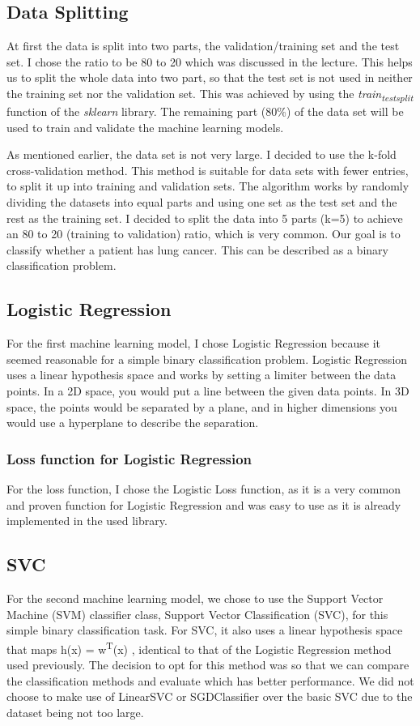 \documentclass[a4paper,12pt]{article}
\begin{document}
\subsection{Data Splitting}
\label{sec:orgf92fcc7}
At first the data is split into two parts, the validation/training set and the test set. I chose the ratio to be 80 to 20 which was discussed in the lecture.
This helps us to split the whole data into two part, so that the test set is not used in neither the training set nor the validation set.
This was achieved by using the \emph{train\textsubscript{test}\textsubscript{split}} function of the \emph{sklearn} library.
The remaining part (80\%) of the data set will be used to train and validate the machine learning models.

As mentioned earlier, the data set is not very large.
I decided to use the k-fold cross-validation method. This method is suitable for data sets with fewer entries, to split it up into training and validation sets.
The algorithm works by randomly dividing the datasets into equal parts and using one set as the test set and the rest as the training set.
I decided to split the data into 5 parts (k=5) to achieve an 80 to 20 (training to validation) ratio, which is very common.
Our goal is to classify whether a patient has lung cancer. This can be described as a binary classification problem.

\subsection{Logistic Regression}
\label{sec:org4df2fe1}
For the first machine learning model, I chose Logistic Regression because it seemed reasonable for a simple binary classification problem.
Logistic Regression uses a linear hypothesis space and works by setting a limiter between the data points.
In a 2D space, you would put a line between the given data points. In 3D space, the points would be separated by a plane, and in higher dimensions you would use a hyperplane to describe the separation.

\subsubsection{Loss function for Logistic Regression}
\label{sec:orgd7be6f8}
For the loss function, I chose the Logistic Loss function, as it is a very common and proven function for Logistic Regression and was easy to use as it is already implemented in the used library.

\subsection{SVC}
\label{sec:org70cc6db}
For the second machine learning model, we chose to use the Support Vector Machine (SVM) classifier class, Support Vector Classification (SVC), for this simple binary classification task. For SVC, it also uses a linear hypothesis space that maps h(x) = w\textsuperscript{T}(x) , identical to that of the Logistic Regression method used previously. The decision to opt for this method was so that we can compare the classification methods and evaluate which has better performance. We did not choose to make use of LinearSVC or SGDClassifier over the basic SVC due to the dataset being not too large.
\end{document}
